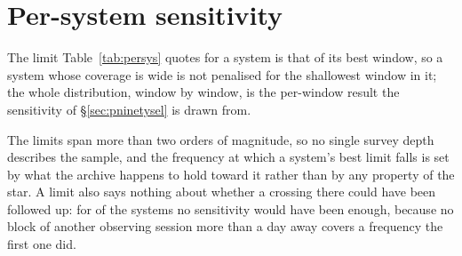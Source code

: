 \section{Per-system sensitivity}
\label{app:persys}

The limit Table~\ref{tab:persys} quotes for a system is that of its best
window, so a system whose coverage is wide is not penalised for the
shallowest window in it; the whole distribution, window by window, is the
per-window result the sensitivity of \S\ref{sec:pninetysel} is drawn from.

The limits span more than two orders of magnitude, so no single survey depth
describes the sample, and the frequency at which a system's best limit falls
is set by what the archive happens to hold toward it rather than by any
property of the star. A limit also says nothing about whether a crossing there
could have been followed up: for \ZcNoRepSys{} of the \NSysClassA{} systems
no sensitivity would have been enough, because no block of another observing
session more than a day away covers a frequency the first one did.
